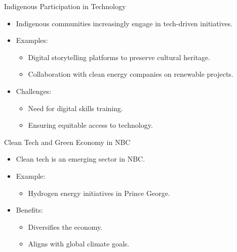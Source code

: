 \documentclass{beamer}
\begin{document}
\begin{frame}{Indigenous Participation in Technology}
    \begin{itemize}
        \item Indigenous communities increasingly engage in tech-driven initiatives.
        \item Examples:
        \begin{itemize}
            \item Digital storytelling platforms to preserve cultural heritage.
            \item Collaboration with clean energy companies on renewable projects.
        \end{itemize}
        \item Challenges:
        \begin{itemize}
            \item Need for digital skills training.
            \item Ensuring equitable access to technology.
        \end{itemize}
    \end{itemize}
\end{frame}

\begin{frame}{Clean Tech and Green Economy in NBC}
    \begin{itemize}
        \item Clean tech is an emerging sector in NBC.
        \item Example:
        \begin{itemize}
            \item Hydrogen energy initiatives in Prince George.
        \end{itemize}
        \item Benefits:
        \begin{itemize}
            \item Diversifies the economy.
            \item Aligns with global climate goals.
        \end{itemize}
    \end{itemize}
\end{frame}
\end{document}
